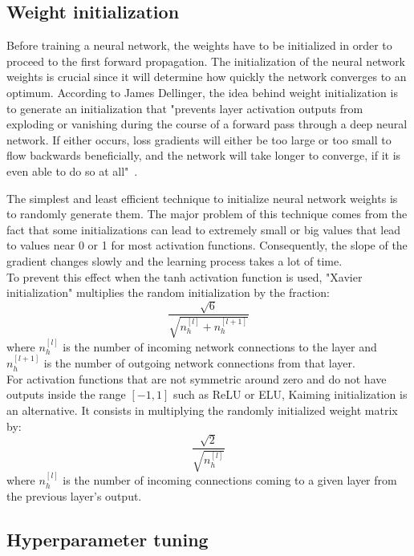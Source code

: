 \subsection{Weight initialization}
\label{weight_initialization}
\setlength{\marginparwidth}{3cm}\leavevmode {}Before training a neural network, the weights have to be initialized in order to proceed to the first forward propagation. The initialization of the neural network weights is crucial since it will determine how quickly the network converges to an optimum. According to James Dellinger, the idea behind weight initialization is to generate an initialization that "prevents layer activation outputs from exploding or vanishing during the course of a forward pass through a deep neural network. If either occurs, loss gradients will either be too large or too small to flow backwards beneficially, and the network will take longer to converge, if it is even able to do so at all"~\cite{27}.

The simplest and least efficient technique to initialize neural network weights is to randomly generate them. The major problem of this technique comes from the fact that some initializations can lead to extremely small or big values that lead to values near 0 or 1 for most activation functions. Consequently, the slope of the gradient changes slowly and the learning process takes a lot of time.\\
To prevent this effect when the tanh activation function is used, "Xavier initialization" multiplies the random initialization by the fraction:
\begin{equation}
\frac{\sqrt{6}}{\sqrt{n_{h}^{[l]}+n_{h}^{[l+1]}}}
\end{equation}
where $n_{h}^{[l]}$ is the number of incoming network connections to the layer and $n_{h}^{[l+1]}$ is the number of outgoing network connections from that layer.\\
For activation functions that are not symmetric around zero and do not have outputs inside the range $[-1,1]$ such as ReLU or ELU, Kaiming initialization is an alternative. It consists in multiplying the randomly initialized weight matrix by:
\begin{equation}
\frac{\sqrt{2}}{\sqrt{n_{h}^{[l]}}}
\end{equation} 
where $n_{h}^{[l]}$ is the number of incoming connections coming to a given layer from the previous layer's output.

\subsection{Hyperparameter tuning}

